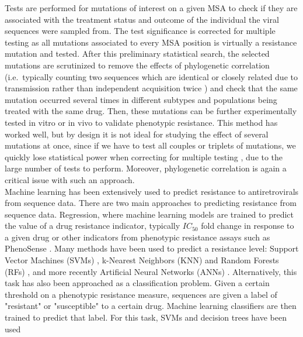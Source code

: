 \documentclass[
  11pt,
  twoside]{scrbook}
\begin{document}
Tests are performed for mutations of interest on a given MSA to check if
they are associated with the treatment status and outcome of the
individual the viral sequences were sampled from. The test significance
is corrected for multiple testing as all mutations associated to every
MSA position is virtually a resistance mutation and tested. After this
preliminary statistical search, the selected mutations are scrutinized
to remove the effects of phylogenetic correlation (i.e.~typically
counting two sequences which are identical or closely related due to
transmission rather than independent acquisition twice
\autocite{maddisonUnsolvedChallengePhylogenetic2015}) and check that the same
mutation occurred several times in different subtypes and populations
being treated with the same drug. Then, these mutations can be further
experimentally tested in vitro or in vivo to validate phenotypic
resistance. This method has worked well, but by design it is not ideal
for studying the effect of several mutations at once, since if we have
to test all couples or triplets of mutations, we quickly lose
statistical power when correcting for multiple testing
\autocite{shamStatisticalPowerSignificance2014}, due to the large number of
tests to perform. Moreover, phylogenetic correlation is again a critical
issue with such an approach.\\
Machine learning has been extensively used to predict resistance to
antiretrovirals from sequence data. There are two main approaches to
predicting resistance from sequence data. Regression, where machine
learning models are trained to predict the value of a drug resistance
indicator, typically \(IC_{50}\) fold change in response to a given drug
\autocite{lengauerBioinformaticsassistedAntiHIVTherapy2006} or other indicators
from phenotypic resistance assays such as PhenoSense
\autocite{zhangComparisonPrecisionSensitivity2005a}. Many methods have been used
to predict a resistance level: Support Vector Machines (SVMs)
\autocite{beerenwinkelGeno2phenoEstimatingPhenotypic2003b}, k-Nearest Neighbors
(KNN) and Random Forests (RFs) \autocite{shenAutomatedPredictionHIV2016a}, and
more recently Artificial Neural Networks (ANNs)
\autocite{yuPredictionHIVDrug2014a,sheikamamuddyImprovingFoldResistance2017b}.
Alternatively, this task has also been approached as a classification
problem. Given a certain threshold on a phenotypic resistance measure,
sequences are given a label of "resistant" or "susceptible" to a
certain drug. Machine learning classifiers are then trained to predict
that label. For this task, SVMs and decision trees have been used
\end{document}
